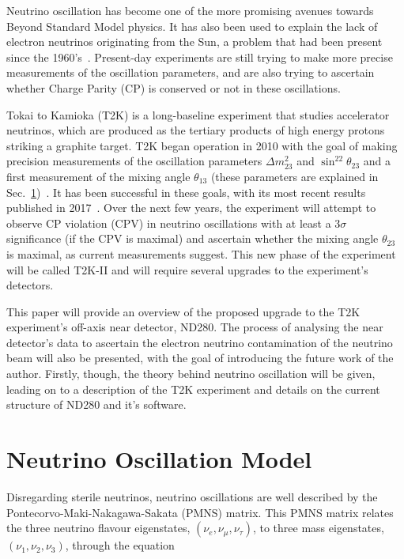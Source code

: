\documentclass[aps,pra,12pt,notitlepage,tightenlines]{revtex4-1}
\begin{document}
Neutrino oscillation has become one of the more promising avenues towards Beyond Standard Model physics. It has also been used to explain the lack of electron neutrinos originating from the Sun, a problem that had been present since the 1960's~\cite{PhysRevLett.89.011301}. Present-day experiments are still trying to make more precise measurements of the oscillation parameters, and are also trying to ascertain whether Charge Parity (CP) is conserved or not in these oscillations.

Tokai to Kamioka (T2K) is a long-baseline experiment that studies accelerator neutrinos, which are produced as the tertiary products of high energy protons striking a graphite target. T2K began operation in 2010 with the goal of making precision measurements of the oscillation parameters $\Delta m^2_{23}$ and $\sin^22\theta_{23}$ and a first measurement of the mixing angle $\theta_{13}$ (these parameters are explained in Sec.\ \ref{sec:osc})~\cite{PhysRevD.88.032002}. It has been successful in these goals, with its most recent results published in 2017~\cite{Abe:2017bay}. Over the next few years, the experiment will attempt to observe CP violation (CPV) in neutrino oscillations with at least a 3$\sigma$ significance (if the CPV is maximal) and ascertain whether the mixing angle $\theta_{23}$ is maximal, as current measurements suggest. This new phase of the experiment will be called T2K-II and will require several upgrades to the experiment's detectors.

This paper will provide an overview of the proposed upgrade to the T2K experiment's off-axis near detector, ND280. The process of analysing the near detector's data to ascertain the electron neutrino contamination of the neutrino beam will also be presented, with the goal of introducing the future work of the author. Firstly, though, the theory behind neutrino oscillation will be given, leading on to a description of the T2K experiment and details on the current structure of ND280 and it's software.

\section{Neutrino Oscillation Model}
\label{sec:osc}
Disregarding sterile neutrinos, neutrino oscillations are well described by the Pontecorvo-Maki-Nakagawa-Sakata (PMNS) matrix. This PMNS matrix relates the three neutrino flavour eigenstates, $(\nu_e, \nu_\mu, \nu_\tau)$, to three mass eigenstates, $(\nu_1, \nu_2, \nu_3)$, through the equation
\end{document}
